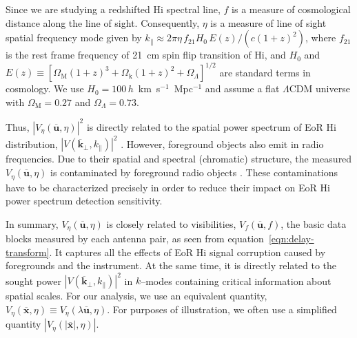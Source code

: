 \documentclass[preprint2,iop,numberedappendix]{emulateapj}
\begin{document}
Since we are studying a redshifted H{\sc i} spectral line, $f$ is a measure of cosmological distance along the line of sight. Consequently, $\eta$ is a measure of line of sight spatial frequency mode given by $k_\parallel\approx 2\pi\eta\,f_{21}H_0\,E(z)/(c(1+z)^2)$, where $f_{21}$ is the rest frame frequency of 21~cm spin flip transition of H{\sc i}, and $H_0$ and $E(z)\equiv [\Omega_\textrm{M}(1+z)^3+\Omega_\textrm{k}(1+z)^2+\Omega_\Lambda]^{1/2}$ are standard terms in cosmology. We use $H_0=100\,h$~km~s$^{-1}$~Mpc$^{-1}$ and assume a flat $\Lambda$CDM universe with $\Omega_\textrm{M}=0.27$ and $\Omega_\Lambda=0.73$.

Thus, $|V_\eta(\overline{\mathbf{u}},\eta)|^2$ is directly related to the spatial power spectrum of EoR H{\sc i} distribution, $|V(\overline{\mathbf{k}}_\perp,k_\parallel)|^2$ \citep{mor04}. However, foreground objects also emit in radio frequencies. Due to their spatial and spectral (chromatic) structure, the measured $V_\eta(\overline{\mathbf{u}},\eta)$ is contaminated by foreground radio objects \citep{thy13,tro12,mor12,bow09}. These contaminations have to be characterized precisely in order to reduce their impact on EoR H{\sc i} power spectrum detection sensitivity. 

In summary, $V_\eta(\overline{\mathbf{u}},\eta)$ is closely related to visibilities, $V_f(\overline{\mathbf{u}},f)$, the basic data blocks measured by each antenna pair, as seen from equation~\ref{eqn:delay-transform}. It captures all the effects of EoR H{\sc i} signal corruption caused by foregrounds and the instrument. At the same time, it is directly related to the sought power $|V(\overline{\mathbf{k}}_\perp,k_\parallel)|^2$ in $k$--modes containing critical information about spatial scales. For our analysis, we use an equivalent quantity, $V_\eta(\overline{\mathbf{x}},\eta) \equiv V_\eta(\lambda\overline{\mathbf{u}},\eta)$. For purposes of illustration, we often use a simplified quantity $|V_\eta(|\overline{\mathbf{x}}|,\eta)|$.
\end{document}
